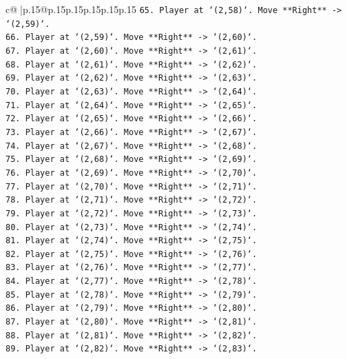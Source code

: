 \documentclass{article}
\begin{document}
{\begin{supertabular}{c@{$\;$}|p{.15\linewidth}@{}p{.15\linewidth}p{.15\linewidth}p{.15\linewidth}p{.15\linewidth}p{.15\linewidth}}
{{{\texttt{65. Player at `(2,58)`. Move **Right** {-}> `(2,59)`.} \\
\texttt{66. Player at `(2,59)`. Move **Right** {-}> `(2,60)`.} \\
\texttt{67. Player at `(2,60)`. Move **Right** {-}> `(2,61)`.} \\
\texttt{68. Player at `(2,61)`. Move **Right** {-}> `(2,62)`.} \\
\texttt{69. Player at `(2,62)`. Move **Right** {-}> `(2,63)`.} \\
\texttt{70. Player at `(2,63)`. Move **Right** {-}> `(2,64)`.} \\
\texttt{71. Player at `(2,64)`. Move **Right** {-}> `(2,65)`.} \\
\texttt{72. Player at `(2,65)`. Move **Right** {-}> `(2,66)`.} \\
\texttt{73. Player at `(2,66)`. Move **Right** {-}> `(2,67)`.} \\
\texttt{74. Player at `(2,67)`. Move **Right** {-}> `(2,68)`.} \\
\texttt{75. Player at `(2,68)`. Move **Right** {-}> `(2,69)`.} \\
\texttt{76. Player at `(2,69)`. Move **Right** {-}> `(2,70)`.} \\
\texttt{77. Player at `(2,70)`. Move **Right** {-}> `(2,71)`.} \\
\texttt{78. Player at `(2,71)`. Move **Right** {-}> `(2,72)`.} \\
\texttt{79. Player at `(2,72)`. Move **Right** {-}> `(2,73)`.} \\
\texttt{80. Player at `(2,73)`. Move **Right** {-}> `(2,74)`.} \\
\texttt{81. Player at `(2,74)`. Move **Right** {-}> `(2,75)`.} \\
\texttt{82. Player at `(2,75)`. Move **Right** {-}> `(2,76)`.} \\
\texttt{83. Player at `(2,76)`. Move **Right** {-}> `(2,77)`.} \\
\texttt{84. Player at `(2,77)`. Move **Right** {-}> `(2,78)`.} \\
\texttt{85. Player at `(2,78)`. Move **Right** {-}> `(2,79)`.} \\
\texttt{86. Player at `(2,79)`. Move **Right** {-}> `(2,80)`.} \\
\texttt{87. Player at `(2,80)`. Move **Right** {-}> `(2,81)`.} \\
\texttt{88. Player at `(2,81)`. Move **Right** {-}> `(2,82)`.} \\
\texttt{89. Player at `(2,82)`. Move **Right** {-}> `(2,83)`.} \\
}}}
\end{supertabular}}
\end{document}
